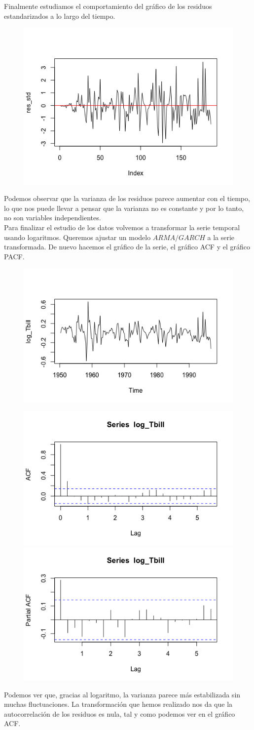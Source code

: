 \documentclass[a4paper,]{article}
\begin{document}
Finalmente estudiamos el comportamiento del gráfico de los residuos estandarizados a lo largo del tiempo.
\begin{figure}[H]
    \centering
    \includegraphics[width=0.5\linewidth]{resstd.png}
\end{figure}
Podemos observar que la varianza de los residuos parece aumentar con el tiempo, lo que nos puede llevar a pensar que la varianza no es constante y por lo tanto, no son variables independientes. \\

Para finalizar el estudio de los datos volvemos a transformar la serie temporal usando logaritmos. Queremos ajustar un modelo $ARMA/GARCH$ a la serie transformada. De nuevo hacemos el gráfico de la serie, el gráfico ACF y el gráfico PACF. 
\begin{figure}[H]
    \centering
    \includegraphics[width=0.5\linewidth]{plotlogtbill.png}
\end{figure}
\begin{figure}[H]
    \centering
     \includegraphics[width=0.4\linewidth]{acflogtbill.png}
    \includegraphics[width=0.4\linewidth]{pacflogtbill.png}
\end{figure}
Podemos ver que, gracias al logaritmo, la varianza parece más estabilizada sin muchas fluctuaciones. La transformación que hemos realizado nos da que la autocorrelación de los residuos es nula, tal y como podemos ver en el gráfico ACF. \\
\end{document}

